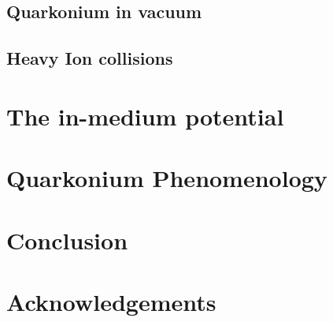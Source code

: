 \documentclass[11pt, a4paper, twoside]{book}
\begin{document}
\section{Quarkonium in vacuum}
\label{sec:quark_vac}
\onehalfspacing
\section{Heavy Ion collisions}
\label{sec:quark_HIC}
\onehalfspacing
\chapter{The in-medium potential}
\label{sec:med_pot}
\onehalfspacing
\chapter{Quarkonium Phenomenology}
\label{sec:quark_pheno}
\onehalfspacing
\chapter{Conclusion}
\label{sec:conc}
\onehalfspacing




\chapter*{Acknowledgements}


\cleardoublepage

\end{document}

